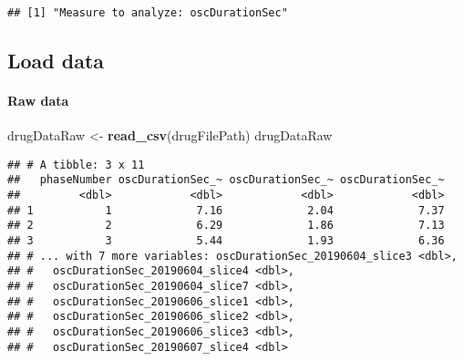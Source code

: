 \documentclass[]{article}
\newenvironment{Shaded}{\begin{snugshade}}{\end{snugshade}}
\newcommand{\CommentTok}[1]{\textcolor[rgb]{0.56,0.35,0.01}{\textit{#1}}}
\newcommand{\DecValTok}[1]{\textcolor[rgb]{0.00,0.00,0.81}{#1}}
\newcommand{\KeywordTok}[1]{\textcolor[rgb]{0.13,0.29,0.53}{\textbf{#1}}}
\newcommand{\NormalTok}[1]{#1}
\newcommand{\OperatorTok}[1]{\textcolor[rgb]{0.81,0.36,0.00}{\textbf{#1}}}
\newcommand{\StringTok}[1]{\textcolor[rgb]{0.31,0.60,0.02}{#1}}
\let\oldparagraph\paragraph
\renewcommand{\paragraph}[1]{\oldparagraph{#1}\mbox{}}
\begin{document}
\begin{Shaded}
\end{Shaded}

\begin{verbatim}
## [1] "Measure to analyze: oscDurationSec"
\end{verbatim}

\hypertarget{load-data}{%
\subsection{Load data}\label{load-data}}

\hypertarget{raw-data}{%
\paragraph{Raw data}\label{raw-data}}

\begin{Shaded}
\begin{Highlighting}[]
\NormalTok{drugDataRaw <-}\StringTok{ }\KeywordTok{read_csv}\NormalTok{(drugFilePath)}
\NormalTok{drugDataRaw}
\end{Highlighting}
\end{Shaded}

\begin{verbatim}
## # A tibble: 3 x 11
##   phaseNumber oscDurationSec_~ oscDurationSec_~ oscDurationSec_~
##         <dbl>            <dbl>            <dbl>            <dbl>
## 1           1             7.16             2.04             7.37
## 2           2             6.29             1.86             7.13
## 3           3             5.44             1.93             6.36
## # ... with 7 more variables: oscDurationSec_20190604_slice3 <dbl>,
## #   oscDurationSec_20190604_slice4 <dbl>,
## #   oscDurationSec_20190604_slice7 <dbl>,
## #   oscDurationSec_20190606_slice1 <dbl>,
## #   oscDurationSec_20190606_slice2 <dbl>,
## #   oscDurationSec_20190606_slice3 <dbl>,
## #   oscDurationSec_20190607_slice4 <dbl>
\end{verbatim}
\end{document}
